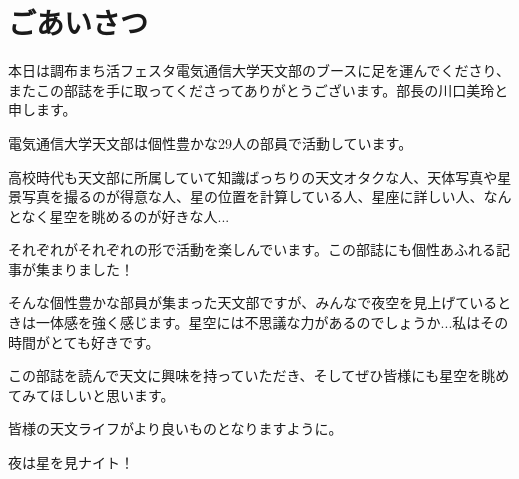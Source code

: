 \documentclass[../../super_nova_2023]{subfiles}
\begin{document}
\chapter{ごあいさつ}
\vspace{2\zw}
\begin{center}


	\phantom{a}\par
	本日は調布まち活フェスタ電気通信大学天文部のブースに足を運んでくださり、またこの部誌を手に取ってくださってありがとうございます。部長の川口美玲と申します。
	
	
	\phantom{a}\par
	電気通信大学天文部は個性豊かな29人の部員で活動しています。
	
	
	\phantom{a}\par
	高校時代も天文部に所属していて知識ばっちりの天文オタクな人、天体写真や星景写真を撮るのが得意な人、星の位置を計算している人、星座に詳しい人、なんとなく星空を眺めるのが好きな人...
	
	
	\phantom{a}\par
	それぞれがそれぞれの形で活動を楽しんでいます。この部誌にも個性あふれる記事が集まりました！
	
	
	\phantom{a}\par
	そんな個性豊かな部員が集まった天文部ですが、みんなで夜空を見上げているときは一体感を強く感じます。星空には不思議な力があるのでしょうか...私はその時間がとても好きです。
	
	
	\phantom{a}\par
	この部誌を読んで天文に興味を持っていただき、そしてぜひ皆様にも星空を眺めてみてほしいと思います。
	
	
	\phantom{a}\par
	皆様の天文ライフがより良いものとなりますように。
	
	
	\phantom{a}\par
	夜は星を見ナイト！
	
	
\end{center}
\vspace{5\zw}
\end{document}
